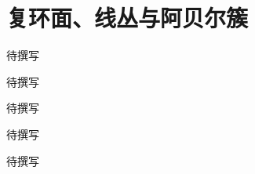 
% 
% 

\chapter{复环面、线丛与阿贝尔簇}
\label{g4:ch:21}

\begin{chapterabstract}
待撰写
\end{chapterabstract}

\begin{learninggoals}
待撰写
\end{learninggoals}

待撰写






\begin{chaptersummary}
待撰写
\end{chaptersummary}

\BookExercises
待撰写

